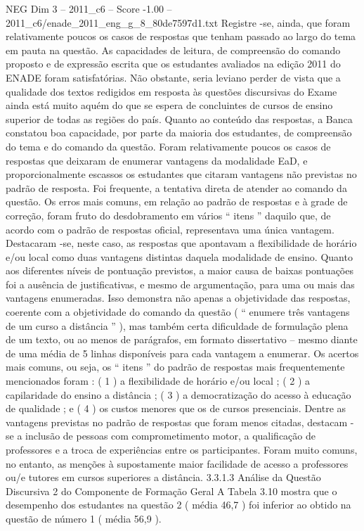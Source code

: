 \begin{textsample}{NEG Dim 3 – 2011\_c6 – Score -1.00 – 2011\_c6/enade\_2011\_eng\_g\_8\_80de7597d1.txt}
Registre -se, ainda, que foram relativamente poucos os casos de respostas que tenham passado ao largo do tema em pauta na questão.
As capacidades de leitura, de compreensão do comando proposto e de expressão escrita que os estudantes avaliados na edição 2011 do ENADE foram satisfatórias.
Não obstante, seria leviano perder de vista que a qualidade dos textos redigidos em resposta às questões discursivas do Exame ainda está muito aquém do que se espera de concluintes de cursos de ensino superior de todas as regiões do país.
Quanto ao conteúdo das respostas, a Banca constatou boa capacidade, por parte da maioria dos estudantes, de compreensão do tema e do comando da questão.
Foram relativamente poucos os casos de respostas que deixaram de enumerar vantagens da modalidade EaD, e proporcionalmente escassos os estudantes que citaram vantagens não previstas no padrão de resposta.
Foi frequente, a tentativa direta de atender ao comando da questão.
Os erros mais comuns, em relação ao padrão de respostas e à grade de correção, foram fruto do desdobramento em vários “ itens ” daquilo que, de acordo com o padrão de respostas oficial, representava uma única vantagem.
Destacaram -se, neste caso, as respostas que apontavam a flexibilidade de horário e/ou local como duas vantagens distintas daquela modalidade de ensino.
Quanto aos diferentes níveis de pontuação previstos, a maior causa de baixas pontuações foi a ausência de justificativas, e mesmo de argumentação, para uma ou mais das vantagens enumeradas.
Isso demonstra não apenas a objetividade das respostas, coerente com a objetividade do comando da questão ( “ enumere três vantagens de um curso a distância ” ), mas também certa dificuldade de formulação plena de um texto, ou ao menos de parágrafos, em formato dissertativo – mesmo diante de uma média de 5 linhas disponíveis para cada vantagem a enumerar.
Os acertos mais comuns, ou seja, os “ itens ” do padrão de respostas mais frequentemente mencionados foram : ( 1 ) a flexibilidade de horário e/ou local ; ( 2 ) a capilaridade do ensino a distância ; ( 3 ) a democratização do acesso à educação de qualidade ; e ( 4 ) os custos menores que os de cursos presenciais.
Dentre as vantagens previstas no padrão de respostas que foram menos citadas, destacam -se a inclusão de pessoas com comprometimento motor, a qualificação de professores e a troca de experiências entre os participantes.
Foram muito comuns, no entanto, as menções à supostamente maior facilidade de acesso a professores ou/e tutores em cursos superiores a distância. 3.3.1.3 Análise da Questão Discursiva 2 do Componente de Formação Geral A Tabela 3.10 mostra que o desempenho dos estudantes na questão 2 ( média 46,7 ) foi inferior ao obtido na questão de número 1 ( média 56,9 ).

\end{textsample}
